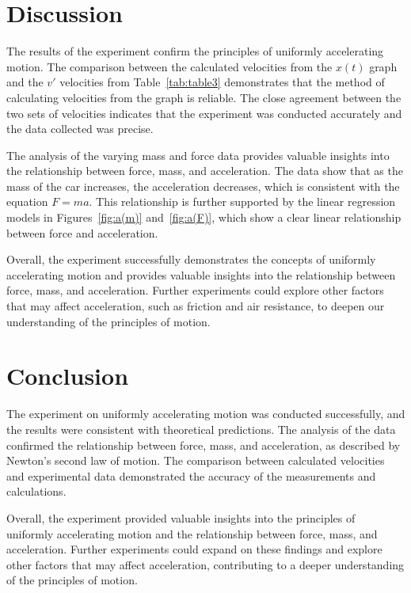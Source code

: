 \documentclass[twocolumn]{article}
\begin{document}
\section{Discussion}
\label{sec:Discussion}

The results of the experiment confirm the principles of uniformly accelerating motion. The comparison between the calculated velocities from the $x(t)$ graph and the $v'$ velocities from Table~\ref{tab:table3} demonstrates that the method of calculating velocities from the graph is reliable. The close agreement between the two sets of velocities indicates that the experiment was conducted accurately and the data collected was precise.

The analysis of the varying mass and force data provides valuable insights into the relationship between force, mass, and acceleration. The data show that as the mass of the car increases, the acceleration decreases, which is consistent with the equation $F=ma$. This relationship is further supported by the linear regression models in Figures~\ref{fig:a(m)} and~\ref{fig:a(F)}, which show a clear linear relationship between force and acceleration.

Overall, the experiment successfully demonstrates the concepts of uniformly accelerating motion and provides valuable insights into the relationship between force, mass, and acceleration. Further experiments could explore other factors that may affect acceleration, such as friction and air resistance, to deepen our understanding of the principles of motion.

\section{Conclusion}
\label{sec:Conclusion}

The experiment on uniformly accelerating motion was conducted successfully, and the results were consistent with theoretical predictions. The analysis of the data confirmed the relationship between force, mass, and acceleration, as described by Newton's second law of motion. The comparison between calculated velocities and experimental data demonstrated the accuracy of the measurements and calculations.

Overall, the experiment provided valuable insights into the principles of uniformly accelerating motion and the relationship between force, mass, and acceleration. Further experiments could expand on these findings and explore other factors that may affect acceleration, contributing to a deeper understanding of the principles of motion.
\end{document}

